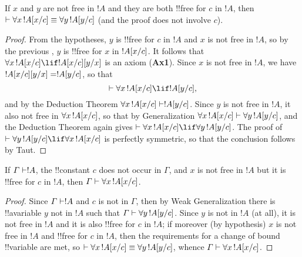 \documentclass[../../include/open-logic-section]{subfiles}
\begin{document}
\begin{lem}
If $x$ and $y$ are not free in $!A$ and they are both !!{free for} $c$
in $!A$, then $\Proves \lforall[x][\Subst{!A}{x}{c}] \equiv
\lforall[y][\Subst{!A}{y}{c}]$ (and the proof does not involve $c$).
\end{lem}

\begin{proof} 
From the hypotheses, $y$ is !!{free for} $c$ in $!A$ and $x$ is not
free in $!A$, so by the previous , $y$ is
!!{free for} $x$ in $!A[x/c]$. It follows that
$\lforall[x][\Subst{!A}{x}{c} \lif \Subst{!A}{x}{c} \Subst{}{y}{x}]$
is an axiom (\textbf{Ax1}). Since $x$ is not free in $!A$, we have
$!A[x/c] [y/x] = !A[y/c]$, so that 
\[
\Proves \lforall[x][\Subst{!A}{x}{c}] \lif \Subst{!A}{y}{c}, 
\] 
and by the Deduction Theorem $\lforall[x][\Subst{!A}{x}{c}] \Proves
\Subst{!A}{y}{c}$. Since $y$ is not free in $!A$, it also not free in
$\lforall[x][\Subst{!A}{x}{c}]$, so that by Generalization
$\lforall[x][\Subst{!A}{x}{c}] \Proves \lforall[y][\Subst{!A}{y}{c}]$,
and the Deduction Theorem again gives $\Proves
\lforall[x][\Subst{!A}{x}{c}] \lif \lforall[y][\Subst{!A}{y}{c}]$.
The proof of $\Proves \lforall[y][\Subst{!A}{y}{c}] \lif \lforall[x]
[\Subst{!A}{x}{c}]$ is perfectly symmetric, so that the conclusion
follows by Taut.
\end{proof}

\begin{thm}
If $\Gamma \Proves !A$, the !!{constant} $c$ does not occur in
$\Gamma$, and $x$ is not free in $!A$ but it is !!{free for} $c$ in $!A$,
then $\Gamma \Proves \lforall[x][\Subst{!A}{x}{c}]$. 
\end{thm}

\begin{proof} 
Since $\Gamma \Proves !A$ and $c$ is not in $\Gamma$, then by
Weak Generalization there is !!a{variable} $y$ not in $!A$ such that
$\Gamma \Proves \lforall[y][\Subst{!A}{y}{c}]$. Since $y$ is not in $!A$
(at all), it is not free in $!A$ and it is also !!{free for} $c$ in $!A$;
if moreover (by hypothesis) $x$ is not free in $!A$ and !!{free for} $c$ in
$!A$, then the requirements for a change of bound !!{variable} are met, so
$\Proves \lforall[x][\Subst{!A}{x}{c}] \equiv
\lforall[y][\Subst{!A}{y}{c}]$, whence $\Gamma \Proves
\lforall[x][\Subst{!A}{x}{c}]$. 
\end{proof}
\end{document}
